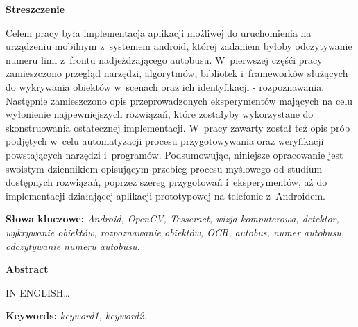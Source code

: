 \begin{center}
	\textbf{Streszczenie}
\end{center}

Celem pracy była implementacja aplikacji możliwej do uruchomienia
na urządzeniu mobilnym z~systemem android, której zadaniem
byłoby odczytywanie numeru linii z~frontu nadjeżdzającego autobusu.
W~pierwszej częśći pracy zamieszczono przegląd narzędzi, algorytmów,
bibliotek i~frameworków służących do wykrywania obiektów w~scenach
oraz ich identyfikacji - rozpoznawania. 
Następnie zamieszczono opis przeprowadzonych eksperymentów
mających na celu wyłonienie najpewniejszych rozwiązań, które
zostałyby wykorzystane do skonstruowania ostatecznej implementacji.
W~pracy zawarty został też opis prób podjętych w~celu automatyzacji
procesu przygotowywania oraz weryfikacji powstających narzędzi 
i~programów.
Podsumowując, niniejsze opracowanie jest 
swoistym dziennikiem opisującym przebieg procesu myślowego
od studium dostępnych rozwiązań, poprzez szereg przygotowań
i~eksperymentów, aż do implementacji działającej aplikacji
prototypowej na telefonie z~Androidem.

\vspace*{\baselineskip}

\noindent\textbf{Słowa kluczowe:} \textit{Android, OpenCV, Tesseract,
wizja komputerowa, detektor, wykrywanie obiektów, rozpoznawanie obiektów,
OCR, autobus, numer autobusu, odczytywanie numeru autobusu.}

\vspace*{2\baselineskip}

\begin{center}
	\textbf{Abstract}
\end{center}

IN ENGLISH\ldots 

\vspace*{\baselineskip}

\noindent\textbf{Keywords:} \textit{keyword1, keyword2.}

\setcounter{page}{2}
